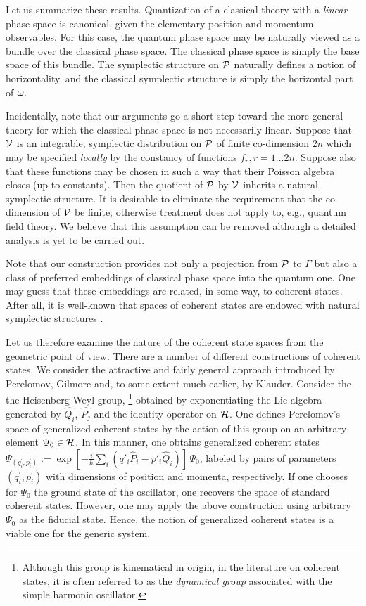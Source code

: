 Let us summarize these results.  Quantization of a classical theory
with a {\em linear} phase space is canonical, given the elementary
position and momentum observables.  For this case, the quantum phase
space may be naturally viewed as a bundle over the classical phase
space.  The classical phase space is simply the base space of this
bundle.  The symplectic structure on $\P$ naturally defines a notion
of horizontality, and the classical symplectic structure is simply the
horizontal part of $\w$.

Incidentally, note that our arguments go a short step toward the more
general theory for which the classical phase space is not necessarily
linear.  Suppose that ${\cal V}$ is an integrable, symplectic
distribution on $\P$ of finite co-dimension $2n$ which may be
specified {\em locally} by the constancy of functions $f_r, r=1 \ldots
2n$.  Suppose also that these functions may be chosen in such a way
that their Poisson algebra closes (up to constants).  Then the
quotient of $\P$ by ${\cal V}$ inherits a natural symplectic
structure.  It is desirable to eliminate the requirement that the
co-dimension of ${\cal V}$ be finite; otherwise treatment does not
apply to, e.g., quantum field theory.  We believe that this assumption
can be removed although a detailed analysis is yet to be carried out.

Note that our construction provides not only a projection from $\P$ to
$\Gamma$ but also a class of preferred embeddings of classical phase
space into the quantum one.  One may guess that these embeddings are
related, in some way, to coherent states.  After all, it is well-known
that spaces of coherent states are endowed with natural symplectic
structures \cite{zhang,perelomov}.

Let us therefore examine the nature of the coherent state spaces from
the geometric point of view.  There are a number of different
constructions of coherent states.  We consider the attractive and
fairly general approach introduced by Perelomov\cite{perelomov1},
Gilmore\cite{gilmore} and, to some extent much earlier, by
Klauder\cite{klauder}. Consider the the Heisenberg-Weyl group,%
%
\footnote{Although this group is kinematical in origin, in
the literature on coherent states, it is often referred to as the
{\em dynamical group} associated with the simple harmonic oscillator.}
%
obtained by exponentiating the Lie algebra generated by $\hat{Q_i}$,
$\hat{P_j}$ and the identity operator on $\H$.  One defines
Perelomov's space of generalized coherent states by the action of this
group on an arbitrary element $\Psi_0 \in \H$. In this manner, one
obtains generalized coherent states $\Psi_{(q^\prime_i, p^\prime_i)}
:= \exp[ -\frac{i}{\hbar}\sum_i(q'_i\hat{P}_i - p'_i\hat{Q}_i)]\, \Psi_0$,
labeled by pairs of parameters $(q^\prime_i, p^\prime_i)$ with
dimensions of position and momenta, respectively.  If one chooses for
$\Psi_0$ the ground state of the oscillator, one recovers the space of
standard coherent states.  However, one may apply the above
construction using arbitrary $\Psi_0$ as the fiducial state. Hence,
the notion of generalized coherent states is a viable one for the
generic system.

